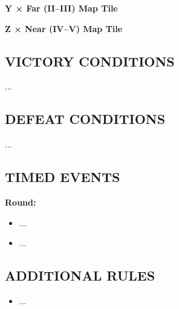 \begin{multicols*}{2}
\textbf{Y × Far (II--III) Map Tile}

\textbf{Z × Near (IV--V) Map Tile}

\subsection*{\MakeUppercase{Victory Conditions}}
...

\subsection*{\MakeUppercase{Defeat Conditions}}
...

\subsection*{\MakeUppercase{Timed Events}}

\textbf{ Round:}
\begin{itemize}
  \item ...
  \item ...
\end{itemize}

%
%
%

\subsection*{\MakeUppercase{Additional Rules}}

\begin{itemize}
    \item ...
\end{itemize}

\end{multicols*}


